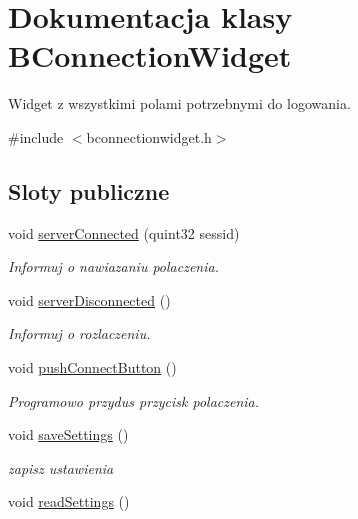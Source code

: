 \hypertarget{class_b_connection_widget}{
\section{Dokumentacja klasy BConnectionWidget}
\label{class_b_connection_widget}
}


Widget z wszystkimi polami potrzebnymi do logowania.  




{\ttfamily \#include $<$bconnectionwidget.h$>$}

\subsection*{Sloty publiczne}
\begin{DoxyCompactItemize}
\item 
void \hyperlink{class_b_connection_widget_a7c9d3a266939c6719fe198f9b3d67636}{serverConnected} (quint32 sessid)
\begin{DoxyCompactList}\small\item\em Informuj o nawiazaniu polaczenia. \item\end{DoxyCompactList}\item 
void \hyperlink{class_b_connection_widget_a159829b06e46c68a354ec999d4b15b61}{serverDisconnected} ()
\begin{DoxyCompactList}\small\item\em Informuj o rozlaczeniu. \item\end{DoxyCompactList}\item 
\hypertarget{class_b_connection_widget_a049a2058a096bd48f3eb5c51bfe765f6}{
void \hyperlink{class_b_connection_widget_a049a2058a096bd48f3eb5c51bfe765f6}{pushConnectButton} ()}
\label{class_b_connection_widget_a049a2058a096bd48f3eb5c51bfe765f6}

\begin{DoxyCompactList}\small\item\em Programowo przydus przycisk polaczenia. \item\end{DoxyCompactList}\item 
\hypertarget{class_b_connection_widget_ac3ec650c9ba4e9d32c68079431e570ed}{
void \hyperlink{class_b_connection_widget_ac3ec650c9ba4e9d32c68079431e570ed}{saveSettings} ()}
\label{class_b_connection_widget_ac3ec650c9ba4e9d32c68079431e570ed}

\begin{DoxyCompactList}\small\item\em zapisz ustawienia \item\end{DoxyCompactList}\item 
\hypertarget{class_b_connection_widget_a4dae54d1ade03d63d57685be40b48503}{
void \hyperlink{class_b_connection_widget_a4dae54d1ade03d63d57685be40b48503}{readSettings} ()}
\label{class_b_connection_widget_a4dae54d1ade03d63d57685be40b48503}


\end{DoxyCompactItemize}

